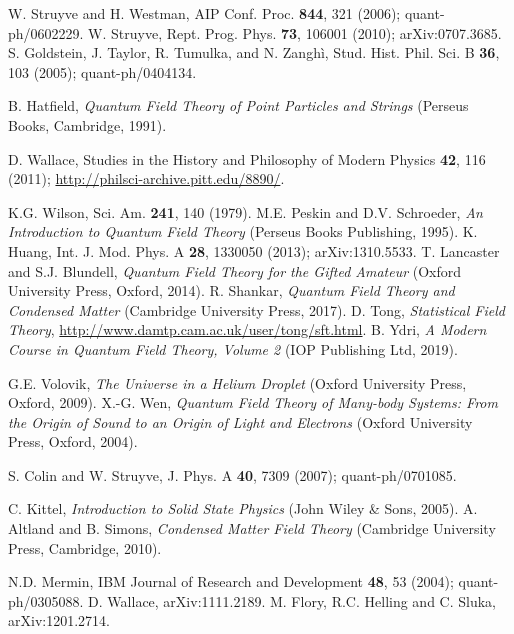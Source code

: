 \documentclass[12pt]{article}
\begin{document}
\begin{thebibliography}{99}
W. Struyve and H. Westman, AIP Conf. Proc. {\bf 844}, 321 (2006); quant-ph/0602229.
W. Struyve, Rept. Prog. Phys. {\bf 73}, 106001 (2010); arXiv:0707.3685.
S. Goldstein, J. Taylor, R. Tumulka, and N. Zangh\`i, Stud. Hist. Phil. Sci. B {\bf 36}, 103 (2005); quant-ph/0404134.

B. Hatfield, {\it Quantum Field Theory of Point Particles and Strings} (Perseus Books, Cambridge, 1991).

D. Wallace,  Studies in the History and Philosophy of Modern Physics {\bf 42}, 116 (2011);
\url{http://philsci-archive.pitt.edu/8890/}.

K.G. Wilson, Sci. Am. {\bf 241}, 140 (1979).
M.E. Peskin and D.V. Schroeder, {\it An Introduction to Quantum Field Theory}
(Perseus Books Publishing, 1995).
K. Huang, Int. J. Mod. Phys. A {\bf 28}, 1330050 (2013); arXiv:1310.5533.
T. Lancaster and S.J. Blundell, {\it Quantum Field Theory for the Gifted Amateur}
(Oxford University Press, Oxford, 2014).
R. Shankar, {\it Quantum Field Theory and Condensed Matter} (Cambridge University Press, 2017).
D. Tong, {\it Statistical Field Theory}, 
\url{http://www.damtp.cam.ac.uk/user/tong/sft.html}.
B. Ydri, {\it A Modern Course in Quantum Field Theory, Volume 2} (IOP Publishing Ltd, 2019).

G.E. Volovik, {\it The Universe in a Helium Droplet} (Oxford University Press, Oxford, 2009).
X.-G. Wen, {\it Quantum Field Theory of Many-body Systems: From the Origin of Sound to an Origin
of Light and Electrons} (Oxford University Press, Oxford, 2004).

S. Colin and W. Struyve, J. Phys. A {\bf 40}, 7309 (2007); quant-ph/0701085.

C. Kittel, {\it Introduction to Solid State Physics} (John Wiley \& Sons, 2005).
A. Altland and B. Simons, {\it Condensed Matter Field Theory}
(Cambridge University Press, Cambridge, 2010).

N.D. Mermin, IBM Journal of Research and Development {\bf 48}, 53 (2004); quant-ph/0305088.
D. Wallace, arXiv:1111.2189.
M. Flory, R.C. Helling and C. Sluka, arXiv:1201.2714.


\end{thebibliography}
\end{document}
